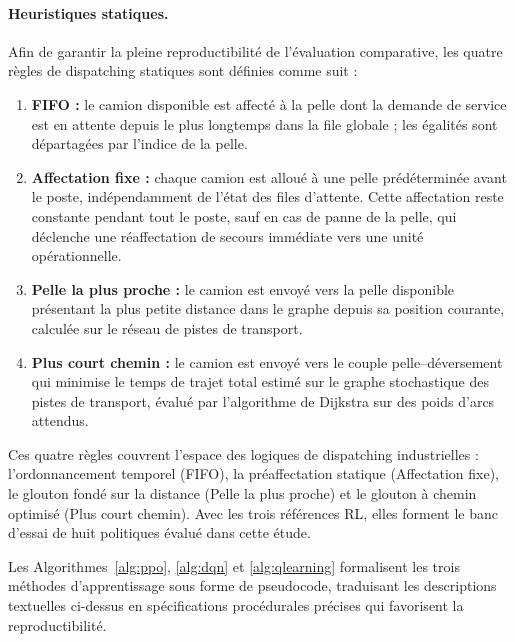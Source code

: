 \documentclass[11pt,a4paper]{article}
\begin{document}
\paragraph{Heuristiques statiques.} Afin de garantir la pleine reproductibilité de l'évaluation comparative, les quatre règles de dispatching statiques sont définies comme suit :

\begin{enumerate}
  \item \textbf{FIFO :} le camion disponible est affecté à la pelle dont la demande de service est en attente depuis le plus longtemps dans la file globale ; les égalités sont départagées par l'indice de la pelle.
  \item \textbf{Affectation fixe :} chaque camion est alloué à une pelle prédéterminée avant le poste, indépendamment de l'état des files d'attente. Cette affectation reste constante pendant tout le poste, sauf en cas de panne de la pelle, qui déclenche une réaffectation de secours immédiate vers une unité opérationnelle.
  \item \textbf{Pelle la plus proche :} le camion est envoyé vers la pelle disponible présentant la plus petite distance dans le graphe depuis sa position courante, calculée sur le réseau de pistes de transport.
  \item \textbf{Plus court chemin :} le camion est envoyé vers le couple pelle--déversement qui minimise le temps de trajet total estimé sur le graphe stochastique des pistes de transport, évalué par l'algorithme de Dijkstra sur des poids d'arcs attendus.
\end{enumerate}

Ces quatre règles couvrent l'espace des logiques de dispatching industrielles : l'ordonnancement temporel (FIFO), la préaffectation statique (Affectation fixe), le glouton fondé sur la distance (Pelle la plus proche) et le glouton à chemin optimisé (Plus court chemin). Avec les trois références RL, elles forment le banc d'essai de huit politiques évalué dans cette étude.

Les Algorithmes~\ref{alg:ppo}, \ref{alg:dqn} et \ref{alg:qlearning} formalisent les trois méthodes d'apprentissage sous forme de pseudocode, traduisant les descriptions textuelles ci-dessus en spécifications procédurales précises qui favorisent la reproductibilité.
\end{document}
